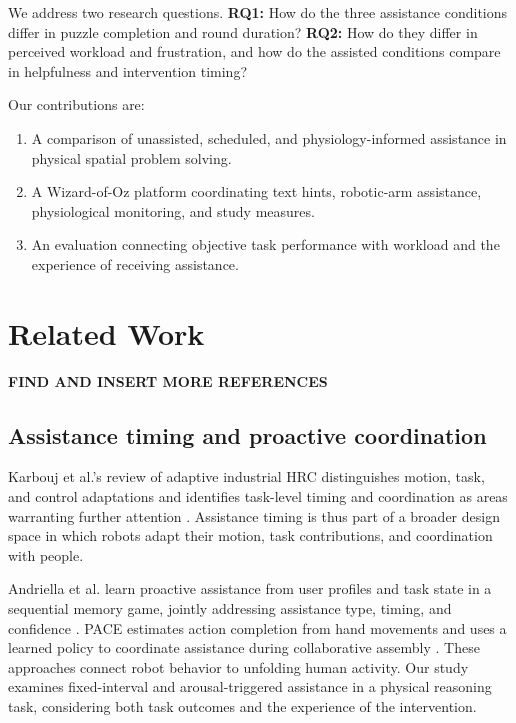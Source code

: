 \documentclass[sigconf,anonymous]{aamas}
\begin{document}
We address two research questions. \textbf{RQ1:} How do the three assistance conditions differ in puzzle completion and round duration? \textbf{RQ2:} How do they differ in perceived workload and frustration, and how do the assisted conditions compare in helpfulness and intervention timing?

Our contributions are:

\begin{enumerate}
\item A comparison of unassisted, scheduled, and physiology-informed assistance in physical spatial problem solving.
\item A Wizard-of-Oz platform coordinating text hints, robotic-arm assistance, physiological monitoring, and study measures.
\item An evaluation connecting objective task performance with workload and the experience of receiving assistance.
\end{enumerate}

\section{Related Work}

\textbf{FIND AND INSERT MORE REFERENCES}

\subsection{Assistance timing and proactive coordination}

Karbouj et al.'s review of adaptive industrial HRC distinguishes motion, task, and control adaptations and identifies task-level timing and coordination as areas warranting further attention \cite{karbouj2026}. Assistance timing is thus part of a broader design space in which robots adapt their motion, task contributions, and coordination with people.

Andriella et al. learn proactive assistance from user profiles and task state in a sequential memory game, jointly addressing assistance type, timing, and confidence \cite{andriella2025}. PACE estimates action completion from hand movements and uses a learned policy to coordinate assistance during collaborative assembly \cite{delazzari2025}. These approaches connect robot behavior to unfolding human activity. Our study examines fixed-interval and arousal-triggered assistance in a physical reasoning task, considering both task outcomes and the experience of the intervention.
\end{document}
